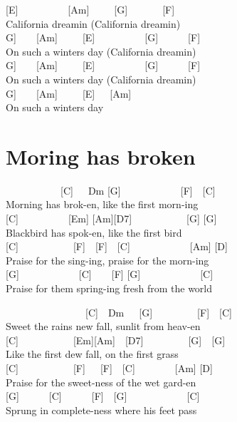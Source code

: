 \documentclass[
  letterpaper,
  twoside=false]{scrbook}
\begin{document}
{[}E{]}~~~~~~~~~~{[}Am{]}~~~~~{[}G{]}~~~~~~~{[}F{]}\\
California dreamin (California dreamin\textquotesingle)\\
\hspace*{0.333em}\hspace*{0.333em}{[}G{]}~~~~{[}Am{]}~~~~~{[}E{]}~~~~~~~~~~{[}G{]}~~~~~~{[}F{]}\\
On such a winter\textquotesingle s day (California
dreamin\textquotesingle)\\
\hspace*{0.333em}\hspace*{0.333em}{[}G{]}~~~~{[}Am{]}~~~~~{[}E{]}~~~~~~~~~~{[}G{]}~~~~~~{[}F{]}\\
On such a winter\textquotesingle s day (California
dreamin\textquotesingle)\\
\hspace*{0.333em}\hspace*{0.333em}{[}G{]}~~~~{[}Am{]}~~~~~{[}E{]}~~~{[}Am{]}\\
On such a winter\textquotesingle s day

\hypertarget{moring-has-broken}{%
\chapter{Moring has broken}\label{moring-has-broken}}

~~~~~~~~~~~{[}C{]}~~~Dm {[}G{]}~~~~~~~~~~~~{[}F{]}~~{[}C{]}\\
Morning has brok-en, like the first morn-ing\\
{[}C{]}~~~~~~~~~~{[}Em{]} {[}Am{]}{[}D7{]}~~~~~~~~~~~{[}G{]} {[}G{]}\\
Blackbird has spok-en, like the first bird\\
{[}C{]}~~~~~~~~~~~{[}F{]}~~{[}F{]}~~{[}C{]}~~~~~~~~~~~~{[}Am{]}
{[}D{]}\\
Praise for the sing-ing, praise for the morn-ing\\
{[}G{]}~~~~~~~~~~~~{[}C{]}~~~~{[}F{]} {[}G{]}~~~~~~~~~~~~{[}C{]}\\
Praise for them spring-ing fresh from the world

~~~~~~~~~~~~~~~~{[}C{]}~~Dm~~~{[}G{]}~~~~~~~~~{[}F{]}~~{[}C{]}\\
Sweet the rain\textquotesingle s new fall, sunlit from heav-en\\
{[}C{]}~~~~~~~~~~~{[}Em{]}{[}Am{]}~~{[}D7{]}~~~~~~~~~{[}G{]}~~{[}G{]}\\
Like the first dew fall, on the first grass\\
{[}C{]}~~~~~~~~~~~{[}F{]}~~~{[}F{]}~~{[}C{]}~~~~~~~~{[}Am{]} {[}D{]}\\
Praise for the sweet-ness of the wet gard-en\\
{[}G{]}~~~~~~{[}C{]}~~~~~~{[}F{]}~~{[}G{]}~~~~~~~~~~~~{[}C{]}\\
Sprung in complete-ness where his feet pass
\end{document}

